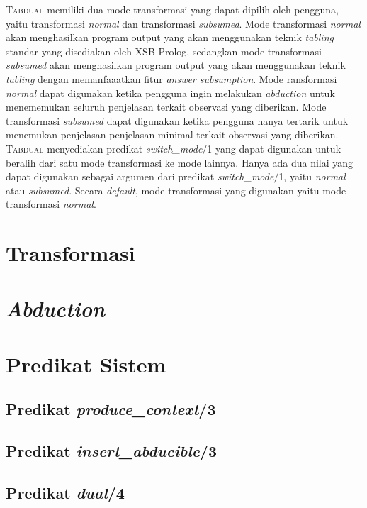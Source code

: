\textsc{Tabdual} memiliki dua mode transformasi yang dapat dipilih oleh pengguna, yaitu transformasi \textit{normal} dan transformasi \textit{subsumed}. Mode transformasi \textit{normal} akan menghasilkan program output yang akan menggunakan teknik \textit{tabling} standar yang disediakan oleh XSB Prolog, sedangkan mode transformasi \textit{subsumed} akan menghasilkan program output yang akan menggunakan teknik \textit{tabling} dengan memanfaaatkan fitur \textit{answer subsumption}. Mode ransformasi \textit{normal} dapat digunakan ketika pengguna ingin melakukan \textit{abduction} untuk menememukan seluruh penjelasan terkait observasi yang diberikan. Mode transformasi \textit{subsumed} dapat digunakan ketika pengguna hanya tertarik untuk menemukan penjelasan-penjelasan minimal terkait observasi yang diberikan. \textsc{Tabdual} menyediakan predikat \textit{switch\_mode$/$}1 yang dapat digunakan untuk beralih dari satu mode transformasi ke mode lainnya. Hanya ada dua nilai yang dapat digunakan sebagai argumen dari predikat \textit{switch\_mode$/$}1, yaitu \textit{normal} atau \textit{subsumed}. Secara \textit{default}, mode transformasi yang digunakan yaitu mode transformasi \textit{normal}.

\section{Transformasi}

\section{\textit{Abduction}}

\section{Predikat Sistem}

\subsection{Predikat \textit{produce\_context}/3}

\subsection{Predikat \textit{insert\_abducible}/3}

\subsection{Predikat \textit{dual}/4}

